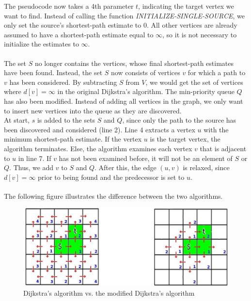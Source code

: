 \documentclass[11pt]{article}
\begin{document}
\noindent The pseudocode now takes a 4th parameter $t$, indicating the target vertex we want to find. Instead of calling the function \textit{INITIALIZE-SINGLE-SOURCE}, we only set the source's shortest-path estimate to 0. All other vertices are already assumed to have a shortest-path estimate equal to $\infty$, so it is not necessary to initialize the estimates to $\infty$.\\\\
The set $S$ no longer contains the vertices, whose final shortest-path estimates have been found. Instead, the set $S$ now consists of vertices $v$ for which a path to $v$ has been considered. By subtracting $S$ from $V$, we would get the set of vertices where $d[v]=\infty$ in the original Dijkstra's algorithm. The min-priority queue $Q$ has also been modified. Instead of adding all vertices in the graph, we only want to insert new vertices into the queue as they are discovered.\\ 
At start, $s$ is added to the sets $S$ and $Q$, since only the path to the source has been discovered and considered (line 2). Line 4 extracts a vertex $u$ with the minimum shortest-path estimate. If the vertex $u$ is the target vertex, the algorithm terminates. Else, the algorithm examines each vertex $v$ that is adjacent to $u$ in line 7. If $v$ has not been examined before, it will not be an element of $S$ or $Q$. Thus, we add $v$ to $S$ and $Q$. After this, the edge $(u,v)$ is relaxed, since $d[v]=\infty$ prior to being found and the predecessor is set to $u$.\\\\
The following figure illustrates the difference between the two algorithms.\\
\begin{figure}[H]
\centering
\includegraphics[scale=0.5]{dijkstra.jpg}
\caption{Dijkstra's algorithm vs. the modified Dijkstra's algorithm}
\end{figure}


\end{document}
